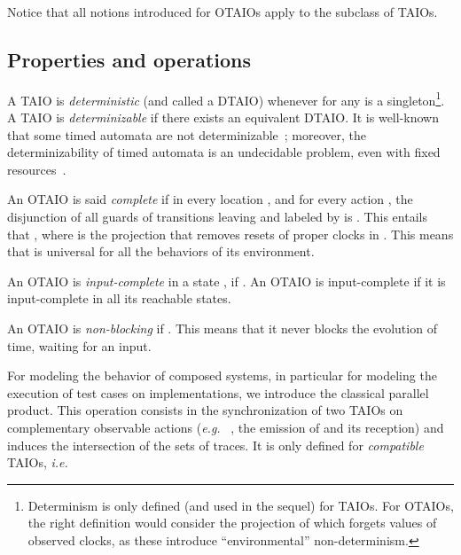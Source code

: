 \documentclass{LMCS}
\theoremstyle{plain}\newtheorem{proposition}[thm]{Proposition}
\def\eg{{\em e.g.}}
\begin{document}
Notice that all notions introduced for OTAIOs apply to the subclass of TAIOs. 



\subsection{Properties and operations}
A TAIO  is {\em deterministic} (and called a DTAIO) whenever for
any  is a
singleton\footnote{Determinism is only defined (and used in the
  sequel) for TAIOs.  For OTAIOs, the right definition would consider
  the projection of  which forgets values of
  observed clocks, as these introduce ``environmental''
  non-determinism.}.  A TAIO  is {\it determinizable} if there
exists an equivalent DTAIO.  It is well-known that some timed automata
are not determinizable~\cite{AlurDill94}; moreover, the
determinizability of timed automata is an undecidable problem, even
with fixed resources~\cite{Tripakis-ipl06,Finkel-formats06}.

 



An OTAIO  is said {\em complete} if in every location ,
 and for every action , the
disjunction of all guards of transitions leaving  and labeled
by  is .  
This entails that 
,
where  is the projection 
that removes resets of proper clocks in .
This means that  is universal for all the behaviors of its environment.


An OTAIO  is {\em input-complete} in a state , if
 .  
An OTAIO   is input-complete if it is input-complete in all its
reachable states.

An OTAIO
 is {\em non-blocking} if .
This means that it never  blocks the evolution of time, waiting for an input.


For modeling the behavior of composed systems, in particular for
modeling the execution of test cases on implementations, we introduce
the classical parallel product. This operation
consists in the synchronization of two TAIOs on complementary
  observable actions (\eg~ , the emission of  and  its reception)
and induces the intersection of the sets of
traces. It is only defined for \emph{compatible} TAIOs,
  \emph{i.e.}
  
\end{document}
